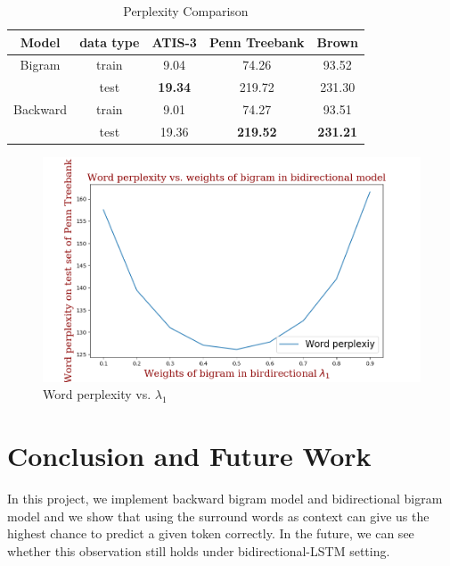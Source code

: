 \documentclass[11pt,a4paper]{article}
\begin{document}
\begin{table}
\captionsetup{justification=centering}
\caption{Perplexity Comparison}
\label{tab:p}
\begin{tabular}{c|c|*3{c}}
\hline
Model & data type & ATIS-3 & Penn Treebank & Brown \\ \hline
Bigram & train & 9.04 & 74.26 & 93.52  \\ 
& test & \textbf{19.34}  & 219.72  & 231.30 \\ \hline
Backward & train & 9.01  & 74.27  & 93.51  \\ 
& test & 19.36  & \textbf{219.52}  & \textbf{231.21} \\ \hline
\end{tabular}
\end{table}

\begin{figure}
\includegraphics[scale=0.4]{figure_1.png}
\caption{Word perplexity vs. $\lambda_1$}
\label{fig:1}
\end{figure}


\section{Conclusion and Future Work}

In this project, we implement backward bigram model and bidirectional bigram model
and we show that using the surround words as context can give us the highest chance
to predict a given token correctly. In the future, we can see whether this observation still
holds under bidirectional-LSTM setting.



\end{document}
